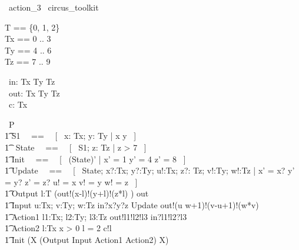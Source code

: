 \begin{zsection}
  \SECTION\ action\_3 \parents\ circus\_toolkit
\end{zsection}

\begin{zed}
    T == \{0, 1, 2\} \\
	Tx == 0 .. 3 \\ 
	Ty == 4 .. 6 \\ 
	Tz == 7 .. 9 \\ 
\end{zed}

\begin{circus}
	\circchannel\ in: Tx \cross Ty \cross Tz \\
	\circchannel\ out: Tx \cross Ty \cross Tz \\
	\circchannel\ c: Tx \\
\end{circus}

\begin{circus}
    \circprocess\ P \circdef \circbegin \\
        \t1 S1 ~~==~~ [~  x: Tx; y: Ty | x  \land y  ~] \\
        \t1 \circstate\ State ~~==~~ [~ S1; z: Tz | z > 7 ~] \\
        \t1 Init ~~==~~ [~ (State)' | x' = 1 \land y' = 4 \land z' = 8 ~] \\
        \t1 Update ~~==~~ [~ \Delta State; x?:Tx; y?:Ty; u!:Tx; z?: Tz; v!:Ty; w!:Tz | x' = x? \land y' = y? \land z' = z? \land u! = x \land v! = y \land w! = z ~] \\
        \t1 Output \circdef \circvar l:T \circspot (out!(x-l)!(y+l)!(z*l) \then \Skip) \circhide \lchanset out \rchanset \\
        \t1 Input \circdef \circvar u:Tx; v:Ty; w:Tz \circspot in?x?y?z \then \lschexpract Update \rschexpract \circseq out!(u \div w+1)!(v-u+1)!(w*v) \then \Skip \\
        \t1 Action1 \circdef \circvar l1:Tx; l2:Ty; l3:Tz \circspot out!l1!l2!l3 \then \Skip \extchoice in?l1!l2?l3 \then \Skip \\
        \t1 Action2 \circdef \circvar l:Tx \circspot \lcircguard x > 0 \land l = 2 \rcircguard \circguard c!l \then \Skip \\
        \t1 \circspot \lschexpract Init \rschexpract \circseq (\circmu X \circspot (Output \extchoice Input \extchoice Action1 \extchoice Action2) \circseq X) \\ 
	\circend
\end{circus}

